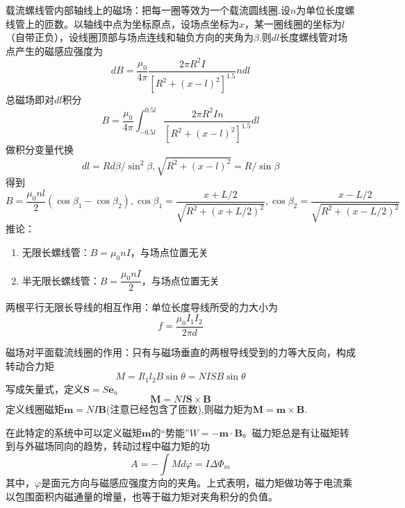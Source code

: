 载流螺线管内部轴线上的磁场：把每一圈等效为一个载流圆线圈.设$n$为单位长度螺线管上的匝数。以轴线中点为坐标原点，设场点坐标为$x$，某一圈线圈的坐标为$l$（自带正负），设线圈顶部与场点连线和轴负方向的夹角为$\beta$.则$dl$长度螺线管对场点产生的磁感应强度为
\begin{equation}
    dB=\dfrac{\mu_0}{4\pi}\dfrac{2\pi R^2 I}{[R^2+(x-l)^2]^{1.5}}ndl
\end{equation}
总磁场即对$dl$积分
\begin{equation}
    B=\dfrac{\mu_0}{4\pi}\int_{-0.5l}^{0.5l}\dfrac{2\pi R^2 In}{[R^2+(x-l)^2]^{1.5}}dl
\end{equation}
做积分变量代换
\begin{equation}
    dl=R d\beta /\sin ^2 \beta,\sqrt{R^2+(x-l)^2}=R/\sin \beta
\end{equation}
得到
\begin{equation}
    B=\dfrac{\mu_0 n l}{2}(\cos \beta_1-\cos \beta_2),\cos \beta_1=\dfrac{x+L/2}{\sqrt{R^2+(x+L/2)^2}},\cos \beta_2=\dfrac{x-L/2}{\sqrt{R^2+(x-L/2)^2}}
\end{equation}
推论：
\begin{enumerate}
    \item 无限长螺线管：$B=\mu_0 nI$，与场点位置无关
    \item 半无限长螺线管：$B=\dfrac{\mu_0 nI}{2}$，与场点位置无关
\end{enumerate}

两根平行无限长导线的相互作用：单位长度导线所受的力大小为
\begin{equation}
    f=\dfrac{\mu_0 I_1I_2}{2\pi d}
\end{equation}

磁场对平面载流线圈的作用：只有与磁场垂直的两根导线受到的力等大反向，构成转动合力矩
\begin{equation}
    M=Il_1l_2B\sin \theta=NISB\sin \theta
\end{equation}
写成矢量式，定义$\bm{S}=S\bm{e}_n$
\begin{equation}
    \bm{M}=NI\bm{S}\times \bm{B}
\end{equation}
定义线圈磁矩$\bm{m}=NI\bm{B}$(注意已经包含了匝数),则磁力矩为$\bm{M}=\bm{m}\times \bm{B}$.

在此特定的系统中可以定义磁矩$\bm{m}$的“势能”$W=-\bm{m}\cdot \bm{B}$。磁力矩总是有让磁矩转到与外磁场同向的趋势，转动过程中磁力矩的功
\begin{equation}
    A=-\int M d\varphi=I\Delta \varPhi_m
\end{equation}
其中，$\varphi$是面元方向与磁感应强度方向的夹角。上式表明，磁力矩做功等于电流乘以包围面积内磁通量的增量，也等于磁力矩对夹角积分的负值。

